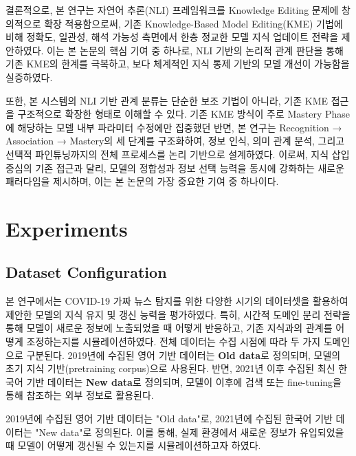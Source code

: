 \documentclass[a4paper,fleqn]{cas-sc}
\begin{document}
결론적으로, 본 연구는 자연어 추론(NLI) 프레임워크를 Knowledge Editing 문제에 창의적으로 확장 적용함으로써, 기존 Knowledge-Based Model Editing(KME) 기법에 비해 정확도, 일관성, 해석 가능성 측면에서 한층 정교한 모델 지식 업데이트 전략을 제안하였다. 이는 본 논문의 핵심 기여 중 하나로, NLI 기반의 논리적 관계 판단을 통해 기존 KME의 한계를 극복하고, 보다 체계적인 지식 통제 기반의 모델 개선이 가능함을 실증하였다.

또한, 본 시스템의 NLI 기반 관계 분류는 단순한 보조 기법이 아니라, 기존 KME 접근을 구조적으로 확장한 형태로 이해할 수 있다. 기존 KME 방식이 주로 Mastery Phase에 해당하는 모델 내부 파라미터 수정에만 집중했던 반면, 본 연구는 Recognition → Association → Mastery의 세 단계를 구조화하여, 정보 인식, 의미 관계 분석, 그리고 선택적 파인튜닝까지의 전체 프로세스를 논리 기반으로 설계하였다. 이로써, 지식 삽입 중심의 기존 접근과 달리, 모델의 정합성과 정보 선택 능력을 동시에 강화하는 새로운 패러다임을 제시하며, 이는 본 논문의 가장 중요한 기여 중 하나이다.







\section{Experiments}

\subsection{Dataset Configuration}

본 연구에서는 COVID-19 가짜 뉴스 탐지를 위한 다양한 시기의 데이터셋을 활용하여 제안한 모델의 지식 유지 및 갱신 능력을 평가하였다.
특히, 시간적 도메인 분리 전략을 통해 모델이 새로운 정보에 노출되었을 때 어떻게 반응하고, 기존 지식과의 관계를 어떻게 조정하는지를 시뮬레이션하였다.
전체 데이터는 수집 시점에 따라 두 가지 도메인으로 구분된다.  
2019년에 수집된 영어 기반 데이터는 \textbf{Old data}로 정의되며, 모델의 초기 지식 기반(pretraining corpus)으로 사용된다.  
반면, 2021년 이후 수집된 최신 한국어 기반 데이터는 \textbf{New data}로 정의되며, 모델이 이후에 검색 또는 fine-tuning을 통해 참조하는 외부 정보로 활용된다.

2019년에 수집된 영어 기반 데이터는 "Old data"로, 2021년에 수집된 한국어 기반 데이터는 "New data"로 정의된다. 
이를 통해, 실제 환경에서 새로운 정보가 유입되었을 때 모델이 어떻게 갱신될 수 있는지를 시뮬레이션하고자 하였다.
\end{document}

